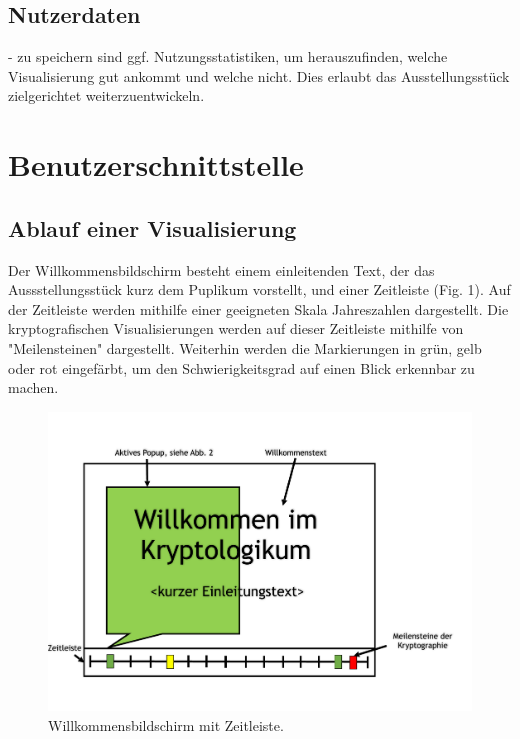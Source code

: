 \documentclass{article}
\begin{document}
\subsection{Nutzerdaten}

- zu speichern sind ggf. Nutzungsstatistiken, um herauszufinden, welche Visualisierung gut ankommt und welche nicht. 
Dies erlaubt das Ausstellungsstück zielgerichtet weiterzuentwickeln.

\section{Benutzerschnittstelle}

\subsection{Ablauf einer Visualisierung}

Der Willkommensbildschirm besteht einem einleitenden Text, der das Aussstellungsstück kurz dem Puplikum vorstellt, und einer Zeitleiste (Fig. 1). Auf der Zeitleiste werden mithilfe einer geeigneten Skala Jahreszahlen dargestellt. Die kryptografischen Visualisierungen werden auf dieser Zeitleiste mithilfe von "Meilensteinen" dargestellt. Weiterhin werden die Markierungen in grün, gelb oder rot eingefärbt, um den Schwierigkeitsgrad auf einen Blick erkennbar zu machen.

\begin{figure}[H]
  \centering
    \includegraphics[width=\textwidth]{resources/ui_walkthrough_start-draft}
  \caption{Willkommensbildschirm mit Zeitleiste.}
\end{figure}
\end{document}
